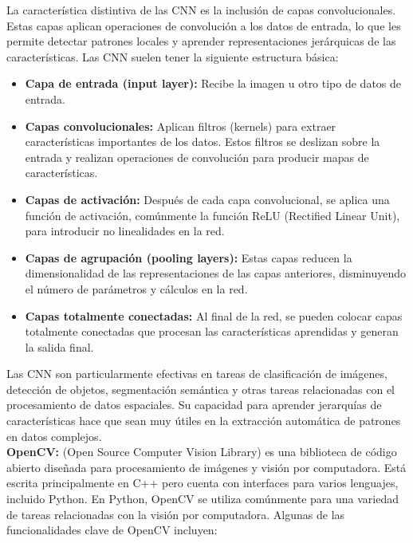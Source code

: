 \documentclass[a4paper,
               ]{jacow}
\begin{document}
La característica distintiva de las CNN es la inclusión de capas convolucionales. Estas capas aplican operaciones de convolución a los datos de entrada, lo que les permite detectar patrones locales y aprender representaciones jerárquicas de las características. Las CNN suelen tener la siguiente estructura básica:
\begin{itemize}
    \item \textbf{Capa de entrada (input layer):} Recibe la imagen u otro tipo de datos de entrada. 
    \item \textbf{Capas convolucionales:} Aplican filtros (kernels) para extraer características importantes de los datos. Estos filtros se deslizan sobre la entrada y realizan operaciones de convolución para producir mapas de características. 
    \item \textbf{Capas de activación:} Después de cada capa convolucional, se aplica una función de activación, comúnmente la función ReLU (Rectified Linear Unit), para introducir no linealidades en la red. 
    \item \textbf{Capas de agrupación (pooling layers):} Estas capas reducen la dimensionalidad de las representaciones de las capas anteriores, disminuyendo el número de parámetros y cálculos en la red.
    \item \textbf{Capas totalmente conectadas:} Al final de la red, se pueden colocar capas totalmente conectadas que procesan las características aprendidas y generan la salida final.
\end{itemize}
Las CNN son particularmente efectivas en tareas de clasificación de imágenes, detección de objetos, segmentación semántica y otras tareas relacionadas con el procesamiento de datos espaciales. Su capacidad para aprender jerarquías de características hace que sean muy útiles en la extracción automática de patrones en datos complejos. 
\\
\textbf{OpenCV:} (Open Source Computer Vision Library) es una biblioteca de código abierto diseñada para procesamiento de imágenes y visión por computadora. Está escrita principalmente en C++ pero cuenta con interfaces para varios lenguajes, incluido Python. En Python, OpenCV se utiliza comúnmente para una variedad de tareas relacionadas con la visión por computadora. Algunas de las funcionalidades clave de OpenCV incluyen:
\end{document}
